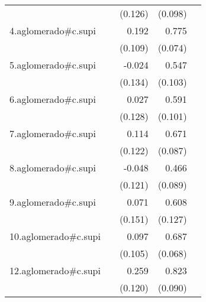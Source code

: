 {\begin{longtable}{l*{4}{D{.}{.}{-1}}}
            &                     &     (0.126)         &     (0.098)         &                     \\
\addlinespace
4.aglomerado#c.supi&                     &       0.192         &       0.775\sym{***}&                     \\
            &                     &     (0.109)         &     (0.074)         &                     \\
\addlinespace
5.aglomerado#c.supi&                     &      -0.024         &       0.547\sym{***}&                     \\
            &                     &     (0.134)         &     (0.103)         &                     \\
\addlinespace
6.aglomerado#c.supi&                     &       0.027         &       0.591\sym{***}&                     \\
            &                     &     (0.128)         &     (0.101)         &                     \\
\addlinespace
7.aglomerado#c.supi&                     &       0.114         &       0.671\sym{***}&                     \\
            &                     &     (0.122)         &     (0.087)         &                     \\
\addlinespace
8.aglomerado#c.supi&                     &      -0.048         &       0.466\sym{***}&                     \\
            &                     &     (0.121)         &     (0.089)         &                     \\
\addlinespace
9.aglomerado#c.supi&                     &       0.071         &       0.608\sym{***}&                     \\
            &                     &     (0.151)         &     (0.127)         &                     \\
\addlinespace
10.aglomerado#c.supi&                     &       0.097         &       0.687\sym{***}&                     \\
            &                     &     (0.105)         &     (0.068)         &                     \\
\addlinespace
12.aglomerado#c.supi&                     &       0.259\sym{*}  &       0.823\sym{***}&                     \\
            &                     &     (0.120)         &     (0.090)         &                     \\

\end{longtable}}
